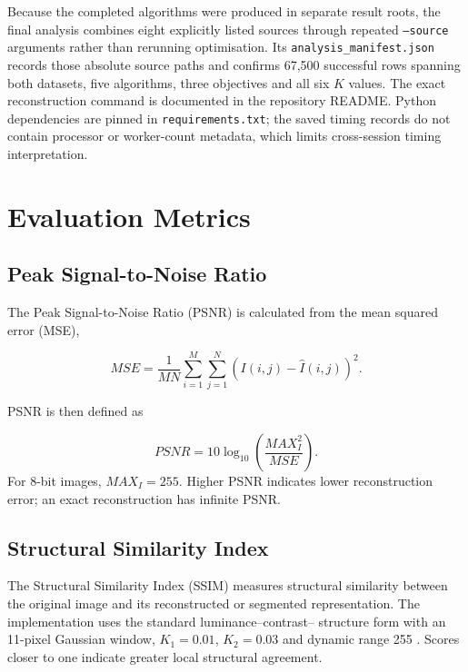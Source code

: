 \documentclass[review]{elsarticle}
\begin{document}
Because the completed algorithms were produced in separate result roots, the
final analysis combines eight explicitly listed sources through repeated
\texttt{--source} arguments rather than rerunning optimisation. Its
\texttt{analysis\_manifest.json} records those absolute source paths and
confirms 67,500 successful rows spanning both datasets, five algorithms,
three objectives and all six $K$ values. The exact reconstruction command is
documented in the repository README. Python dependencies are pinned in
\texttt{requirements.txt}; the saved timing records do not contain processor
or worker-count metadata, which limits cross-session timing interpretation.





\section{Evaluation Metrics}
\label{sec:metrics}


\subsection{Peak Signal-to-Noise Ratio}

The Peak Signal-to-Noise Ratio (PSNR) is calculated from the mean
squared error (MSE),

\begin{equation}
MSE =
\frac{1}{MN}
\sum_{i=1}^{M}
\sum_{j=1}^{N}
\left(
I(i,j)-\hat{I}(i,j)
\right)^2.
\end{equation}

PSNR is then defined as

\begin{equation}
PSNR =
10\log_{10}
\left(
\frac{MAX_I^2}{MSE}
\right).
\end{equation}
For 8-bit images, $MAX_I=255$. Higher PSNR indicates lower reconstruction
error; an exact reconstruction has infinite PSNR.


\subsection{Structural Similarity Index}

The Structural Similarity Index (SSIM) measures structural similarity
between the original image and its reconstructed or segmented
representation. The implementation uses the standard luminance--contrast--
structure form with an 11-pixel Gaussian window, $K_1=0.01$, $K_2=0.03$ and
dynamic range 255 \citep{wang2004ssim}. Scores closer to one indicate greater local structural
agreement.
\end{document}
